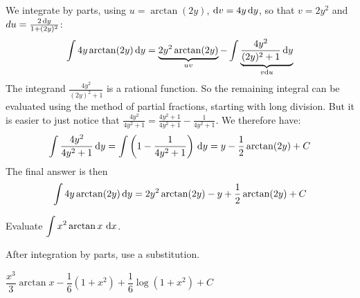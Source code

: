 \begin{solution}
We integrate by parts, using $u = \arctan(2y)$, $\mathrm{d}v = 4y \,\mathrm{d}y$,
so that $v=2y^2$ and $du = \frac{2\, \mathrm{d}y}{1+(2y)^2}$:
\begin{align*}
\int 4y\arctan(2y) \,\mathrm{d}y
   = \underbrace{2y^2\arctan(2y)}_{uv} - \int\underbrace{ \frac{4y^2}{(2y)^2+1} \,\mathrm{d}y}_{v\mathrm{d}u}
\end{align*}
The integrand $\frac{4y^2}{(2y)^2+1}$ is a rational function.
            So the remaining integral can be evaluated using the method of partial
            fractions, starting with long division. But it is easier to just notice
            that
$\frac{4y^2}{4y^2+1} = \frac{4y^2+1}{4y^2+1} - \frac{1}{4y^2+1}$.
We therefore have:
\begin{align*}
\int \frac{4y^2}{4y^2+1} \,\mathrm{d}y
  = \int \left(1 - \frac{1}{4y^2+1}\right)\,\mathrm{d}y
  = y - \frac12\arctan(2y) + C
\end{align*}
The final answer is then
\begin{align*}
 \int 4y\arctan(2y) \,\mathrm{d}y
 = 2y^2\arctan(2y) - y + \frac{1}{2}\arctan(2y) + C
\end{align*}
\end{solution}
\begin{Mquestion}
Evaluate $\displaystyle\int x^2\arctan x ~\mathrm{d}x$.
\end{Mquestion}
\begin{hint}
After integration by parts, use a substitution.
\end{hint}
\begin{answer}
$\dfrac{x^3}{3}\arctan x- \dfrac{1}{6}(1+x^2) + \dfrac{1}{6}\log(1+x^2)+C$
\end{answer}
